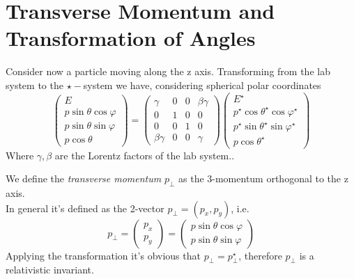 \documentclass[../admech.tex]{subfiles}
\begin{document}
\section{Transverse Momentum and Transformation of Angles}
Consider now a particle moving along the z axis. Transforming from the lab system to the $\star-$system we have, considering spherical polar coordinates
\begin{equation}
	\begin{pmatrix}
		E\\
		p\sin\theta\cos\varphi\\
		p\sin\theta\sin\varphi\\
		p\cos\theta
	\end{pmatrix}=
	\begin{pmatrix}
		\gamma&0&0&\beta\gamma\\
		0&1&0&0\\
		0&0&1&0\\
		\beta\gamma&0&0&\gamma
	\end{pmatrix}
	\begin{pmatrix}
		E^\star\\
		p^\star\cos\theta^\star\cos\varphi^\star\\
		p^\star\sin\theta^\star\sin\varphi^\star\\
		p\cos\theta^\star
	\end{pmatrix}
	\label{eq:transversemomtrans}
\end{equation}
Where $\gamma,\beta$ are the Lorentz factors of the lab system..\\
\begin{dfn}
	We define the \emph{transverse momentum} $p_\perp$ as the 3-momentum orthogonal to the z axis.\\
	In general it's defined as the 2-vector $p_\perp=(p_x,p_y)$, i.e.
	\begin{equation}
		p_\perp=\begin{pmatrix}
			p_x\\
			p_y
		\end{pmatrix}=\begin{pmatrix}
			p\sin\theta\cos\varphi\\
			p\sin\theta\sin\varphi
		\end{pmatrix}
		\label{eq:perpmom}
	\end{equation}
	Applying the transformation it's obvious that $p_\perp=p_\perp^\star$, therefore $p_\perp$ is a relativistic invariant.\\
\end{dfn}
\end{document}
